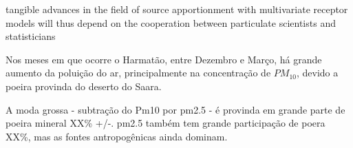 tangible advances in the field of source apportionment with multivariate
receptor models will thus depend on the cooperation between particulate
scientists and statisticians



Nos meses em que ocorre o Harmatão, entre Dezembro e Março, há grande aumento da
poluição do ar, principalmente na concentração de $PM_{10}$, devido a poeira 
provinda do deserto do Saara. 

A moda grossa - subtração do Pm10 por pm2.5 - é provinda em grande parte
de poeira mineral XX\% +/-. pm2.5 também tem grande participação de poera XX\%, 
mas as fontes antropogênicas ainda dominam.
